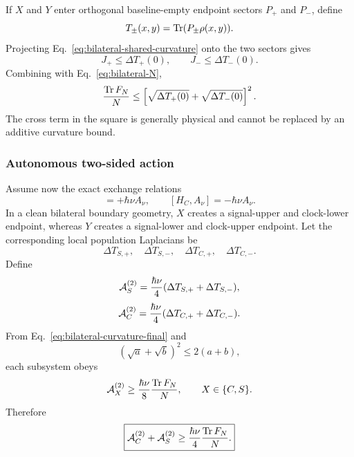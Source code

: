 If $X$ and $Y$ enter orthogonal baseline-empty endpoint sectors $P_+$ and $P_-$, define
\begin{equation}
T_\pm(x,y)=\operatorname{Tr}(P_\pm\rho(x,y)).
\end{equation}
Projecting Eq.~\eqref{eq:bilateral-shared-curvature} onto the two sectors gives
\begin{equation}
J_+\le\Delta T_+(0),
\qquad
J_-\le\Delta T_-(0).
\end{equation}
Combining with Eq.~\eqref{eq:bilateral-N},
\begin{equation}
\frac{\operatorname{Tr} F_N}{N}
\le
\left[\sqrt{\Delta T_+(0)}+\sqrt{\Delta T_-(0)}\right]^2.
\label{eq:bilateral-curvature-final}
\end{equation}
The cross term in the square is generally physical and cannot be replaced by an additive curvature bound.

\subsubsection{Autonomous two-sided action}

Assume now the exact exchange relations
\begin{equation}
[H_S,A_\nu]=+\hbar\nu A_\nu,
\qquad
[H_C,A_\nu]=-\hbar\nu A_\nu.
\end{equation}
In a clean bilateral boundary geometry, $X$ creates a signal-upper and clock-lower endpoint, whereas $Y$ creates a signal-lower and clock-upper endpoint. Let the corresponding local population Laplacians be
\begin{equation}
\Delta T_{S,+},\quad\Delta T_{S,-},\quad
\Delta T_{C,+},\quad\Delta T_{C,-}.
\end{equation}
Define
\begin{equation}
\mathcal A_S^{(2)}
=\frac{\hbar\nu}{4}
(\Delta T_{S,+}+\Delta T_{S,-}),
\end{equation}
\begin{equation}
\mathcal A_C^{(2)}
=\frac{\hbar\nu}{4}
(\Delta T_{C,+}+\Delta T_{C,-}).
\end{equation}
From Eq.~\eqref{eq:bilateral-curvature-final} and
\begin{equation}
(\sqrt a+\sqrt b)^2\le2(a+b),
\end{equation}
each subsystem obeys
\begin{equation}
\mathcal A_X^{(2)}
\ge\frac{\hbar\nu}{8}\frac{\operatorname{Tr} F_N}{N},
\qquad X\in\{C,S\}.
\end{equation}
Therefore
\begin{equation}
\boxed{
\mathcal A_C^{(2)}+\mathcal A_S^{(2)}
\ge\frac{\hbar\nu}{4}\frac{\operatorname{Tr} F_N}{N}.
}
\label{eq:autonomous-bilateral-action-proof}
\end{equation}

